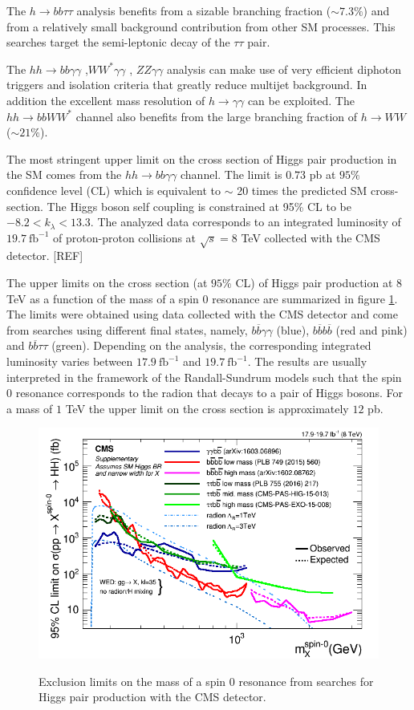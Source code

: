 The $h\rightarrow bb\tau\tau$ analysis \cite{hhbbtautau_CMS,hhATLAS} benefits from a sizable branching fraction ($\sim 7.3\%$) and from a relatively small background contribution from other SM processes. This searches target the semi-leptonic decay of the $\tau\tau$ pair.

The $hh\rightarrow bb\gamma\gamma$ \cite{hhbbAA_CMS,hhAAbb_ATLAS},$WW^*\gamma\gamma$ \cite{hhATLAS,hhbbll_CMS}, $ZZ\gamma\gamma$ \cite{hhbbll_CMS} analysis can make use of very efficient diphoton triggers and isolation criteria that greatly reduce multijet background. In addition the excellent mass resolution of $h\rightarrow \gamma\gamma$ can be exploited. The $hh\rightarrow bbWW^*$ channel also benefits from the large branching fraction of $h\rightarrow WW$ ($\sim 21 \%$).

The most stringent upper limit on the cross section of Higgs pair production in the SM comes from the $hh\rightarrow bb\gamma\gamma$ channel. The limit is $0.73$ pb at $95\%$ confidence level (CL) which is equivalent to $\sim$ 20 times the predicted SM cross-section. The Higgs boson self coupling is constrained at 95\% CL to be $-8.2<k_{\lambda}<13.3$. The analyzed data corresponds to an integrated luminosity of $19.7~\text{fb}^{-1}$ of proton-proton collisions at $\sqrt{s}=8$ TeV collected with the CMS detector. [REF]

The upper limits on the cross section (at $95$\% CL) of Higgs pair production at $8$ TeV as a function of the mass of a spin 0 resonance are summarized in figure \ref{fig:CMS_BSMlim}. The limits were obtained using data collected with the CMS detector and come from searches using different final states, namely, $b\overline{b}\gamma\gamma$ (blue), $b\overline{b}b\overline{b}$ (red and pink) and $b\overline{b}\tau\tau$ (green). Depending on the analysis, the corresponding integrated luminosity varies between $17.9~\text{fb}^{-1}$ and $19.7~\text{fb}^{-1}$. The results are usually interpreted in the framework of the Randall-Sundrum models such that the spin 0 resonance corresponds to the radion that decays to a pair of Higgs bosons. For a mass of $1$ TeV the upper limit on the cross section is approximately $12$ pb.

\begin{figure}
	\centering
	\includegraphics[width=.7\textwidth]{./Figures/CMS_spin0_exc.png}
	\label{fig:CMS_BSMlim}
	\caption{Exclusion limits on the mass of a spin 0 resonance from searches for Higgs pair production with the CMS detector.}
\end{figure}

